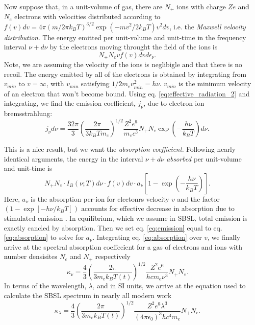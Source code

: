 \documentclass[prb,aps,nofootinbib,superscriptaddress,floatfix]{revtex4-2}
\begin{document}
Now suppose that, in a unit-volume of gas, there are $N_+$ ions with charge $Ze$ and $N_e$ electrons with velocities distributed according to $f(v)dv=4\pi(m/2\pi k_B T)^{3 / 2} \exp(-mv^2 / 2 k_B T) v^2 dv$, i.e. the \emph{Maxwell velocity distribution}. The energy emitted per unit-volume and unit-time in the frequency interval $\nu+d\nu$ by the electrons moving throught the field of the ions is 
\begin{equation}
    N_+ N_e v f(v) dv d\epsilon_\nu.
    \label{eq:emission}
\end{equation}
Note, we are assuming the velocity of the ions is neglibigle and that there is no recoil. The energy emitted by all of the electrons is obtained by integrating from $v_{min}$ to $v=\infty$, with $v_{min}$ satisfying $1/2 m_e v^2_{min}=h\nu$. $v_{min}$ is the minimum velocity of an electron that won't become bound. Using eq. \ref{eq:effective_radiation_2} and integrating, we find the emission coefficient, $j_\nu$, due to electron-ion bremsstrahlung:
\begin{equation}
    j_\nu d \nu=\frac{32\pi}{3}\left( \frac{2\pi}{3k_B T m_e} \right)^{1/2} \frac{Z^2 e^6}{m_e c^3} N_+ N_e \exp\left( -\frac{h\nu}{k_B T} \right)d\nu.
\end{equation}

This is a nice result, but we want the \emph{absorption coefficient}. Following nearly identical arguments, the energy in the interval $\nu+d\nu$ \emph{absorbed} per unit-volume and unit-time is
\begin{equation}
    N_+ N_e \cdot I_B(\nu;T) d\nu \cdot f(v) dv \cdot a_\nu \left[ 1-\exp\left( -\frac{h\nu}{k_B T} \right)\right].
    \label{eq:absorption}
\end{equation}
Here, $a_\nu$ is the absorption per-ion for electonrs velocity $v$ and the factor $(1-\exp[-h\nu/k_B T])$ accounts for effective decrease in absorption due to stimulated emission \cite{zel2002physics}. In equilibrium, which we assume in SBSL, total emission is exactly cancled by absorption. Then we set eq. \ref{eq:emission} equal to eq. \ref{eq:absorption} to solve for $a_\nu$. Integrating eq. \ref{eq:absorption} over $v$, we finally arrive at the spectral absorption coeffecient for a gas of electrons and ions with number densisites $N_e$ and $N_+$ respectively
\begin{equation}
    \kappa_\nu = \frac{4}{3} \left( \frac{2\pi}{3 m_e k_B T(t)} \right)^{1/2} \frac{Z^2 e^6}{h c m_e \nu^3} N_+ N_e .
\end{equation}
In terms of the wavelength, $\lambda$, and in SI units, we arrive at the equation used to calculate the SBSL spectrum in nearly all modern work \cite{hilgenfeldt1999simple,an2006mechanism,an2008spectral,an2009diagnosing}
\begin{equation}
    \kappa_\lambda = \frac{4}{3} \left( \frac{2\pi}{3 m_e k_B T(t)} \right)^{1/2} \frac{Z^2 e^6 \lambda^3}{ (4 \pi \epsilon_0)^3 h c^4 m_e } N_+ N_e .
    \label{eq:absorption_coeff}
\end{equation}
\end{document}
